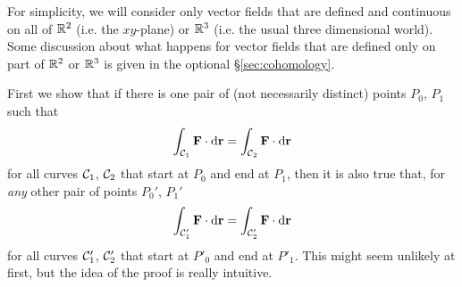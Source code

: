  For simplicity, we will consider only vector fields that are defined and continuous on all of $\mathbb{R}^2$
(i.e. the $xy$-plane) or $\mathbb{R}^3$ (i.e. the usual three dimensional world).
Some discussion about what happens for vector fields that are defined only 
on part of $\mathbb{R}^2$ or $\mathbb{R}^3$ is given in the optional 
\S\ref{sec:cohomology}. 

First we show that if there is one pair of (not necessarily distinct)
points $P_0$, $P_1$ such that
\begin{equation*}
\int_{\mathcal{C}_1}\mathbf{F}\cdot\mathrm{d}\mathbf{r}=
\int_{\mathcal{C}_2}\mathbf{F}\cdot\mathrm{d}\mathbf{r}
\end{equation*}
for all curves $\mathcal{C}_1$, $\mathcal{C}_2$ that start at $P_0$ and end at $P_1$,
then it is also true that, for \emph{any} other pair of points 
$P_0'$, $P_1'$
\begin{equation*}
\int_{\mathcal{C}'_1}\mathbf{F}\cdot\mathrm{d}\mathbf{r}=
\int_{\mathcal{C}'_2}\mathbf{F}\cdot\mathrm{d}\mathbf{r}
\end{equation*}
for all curves $\mathcal{C}'_1$, $\mathcal{C}'_2$ that start at $P'_0$ and end at $P'_1$.
This might seem unlikely at first, but the idea of the proof is really 
intuitive.


